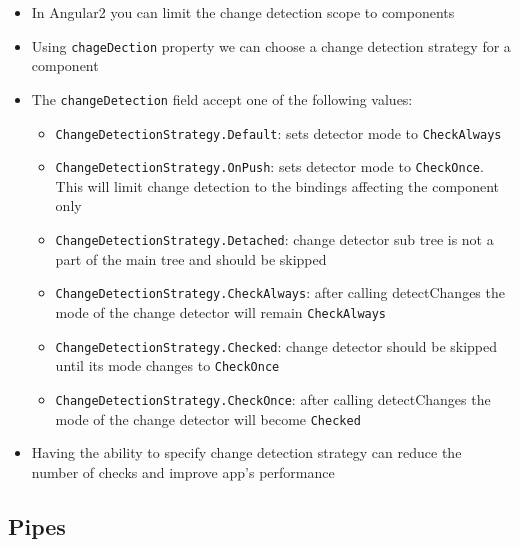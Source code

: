 \documentclass[12pt,]{article}
\providecommand{\tightlist}{%
  \setlength{\itemsep}{0pt}\setlength{\parskip}{0pt}}
\begin{document}
\begin{itemize}
\item
  In Angular2 you can limit the change detection scope to components
\item
  Using \texttt{chageDection} property we can choose a change detection
  strategy for a component
\item
  The \texttt{changeDetection} field accept one of the following values:

  \begin{itemize}
  \tightlist
  \item
    \texttt{ChangeDetectionStrategy.Default}: sets detector mode to
    \texttt{CheckAlways}
  \item
    \texttt{ChangeDetectionStrategy.OnPush}: sets detector mode to
    \texttt{CheckOnce}. This will limit change detection to the bindings
    affecting the component only
  \item
    \texttt{ChangeDetectionStrategy.Detached}: change detector sub tree
    is not a part of the main tree and should be skipped
  \item
    \texttt{ChangeDetectionStrategy.CheckAlways}: after calling
    detectChanges the mode of the change detector will remain
    \texttt{CheckAlways}
  \item
    \texttt{ChangeDetectionStrategy.Checked}: change detector should be
    skipped until its mode changes to \texttt{CheckOnce}
  \item
    \texttt{ChangeDetectionStrategy.CheckOnce}: after calling
    detectChanges the mode of the change detector will become
    \texttt{Checked}
  \end{itemize}
\item
  Having the ability to specify change detection strategy can reduce the
  number of checks and improve app's performance
\end{itemize}

\subsection{Pipes}\label{pipes}
\end{document}
